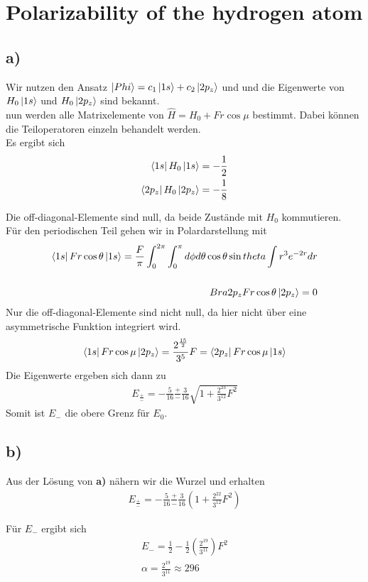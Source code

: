 \section{Polarizability of the hydrogen atom}

\subsection{a)}
Wir nutzen den Ansatz $ \Ket{Phi} = c_1 \Ket{1s} + c_2 \Ket{2p_z} $ und
und die Eigenwerte von $H_0 \Ket{1s}$ und  $H_0 \Ket{2p_z}$ sind bekannt.\\
nun werden alle Matrixelemente von $ \hat{H} = H_0 + Fr \cos{\mu}$ bestimmt. Dabei k\"onnen die Teiloperatoren einzeln behandelt werden. \\
Es ergibt sich
\begin{align}
\Bra{1s} H_0 \Ket{1s} = -\frac{1}{2} \\
\Bra{2p_z} H_0 \Ket{2p_z} = -\frac{1}{8}
\end{align}

Die off-diagonal-Elemente sind null, da beide Zust\"ande mit $H_0$ kommutieren.\\

F\"ur den periodischen Teil gehen wir in Polardarstellung mit
\begin{align}
\Bra{1s} Fr \cos{\theta} \Ket{1s} = \frac{F}{\pi} \int_{0}^{2\pi} \int_0^{\pi} d\phi d\theta \cos{\theta} \sin{theta} \int r^3 e^{-2r} dr \\
\\Bra{2p_z} Fr \cos{\theta} \Ket{2p_z} = 0
\end{align}
Nur die off-diagonal-Elemente sind nicht null, da hier nicht \"uber eine asymmetrische Funktion integriert wird.
\begin{align}
\Bra{1s} Fr \cos{\mu} \Ket{2p_z} = \frac{2^{\frac{15}{2}}}{3^5} F = \Bra{2p_z} Fr \cos{\mu} \Ket{1s}
\end{align}
Die Eigenwerte ergeben sich dann zu
\begin{align}
E_{\frac{+}{-}} = -\frac{5}{16} \frac{+}{-} \frac{3}{16} \sqrt{1+\frac{2^{23}}{3^{12}} F^2}
\end{align}
Somit ist $E_-$ die obere Grenz f\"ur $E_0$.

\subsection{b)}
Aus der L\"osung von \textbf{a)} n\"ahern wir die Wurzel und erhalten
\begin{align}
E_{\frac{+}{-}} = -\frac{5}{16} \frac{+}{-} \frac{3}{16} \left( 1 + \frac{2^{22}}{3^{12}} F^2 \right)
\end{align}

F\"ur $E_-$ ergibt sich
\begin{align}
E_- = \frac{1}{2} - \frac{1}{2} \left( \frac{2^{19}}{3^{11}} \right) F^2 \\
\alpha = \frac{2^{19}}{3^{11}} \approx 296
\end{align}